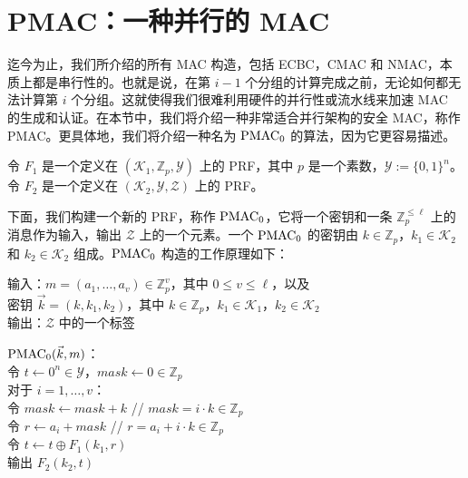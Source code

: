 \section{PMAC：一种并行的 MAC}\label{sec:6-11}

迄今为止，我们所介绍的所有 MAC 构造，包括 ECBC，CMAC 和 NMAC，本质上都是串行性的。也就是说，在第 $i-1$ 个分组的计算完成之前，无论如何都无法计算第 $i$ 个分组。这就使得我们很难利用硬件的并行性或流水线来加速 MAC 的生成和认证。在本节中，我们将介绍一种非常适合并行架构的安全 MAC，称作 PMAC。更具体地，我们将介绍一种名为 $\rm PMAC_0$ 的算法，因为它更容易描述。

令 $F_1$ 是一个定义在 $(\mathcal{K}_1,\mathbb{Z}_p,\mathcal{Y})$ 上的 PRF，其中 $p$ 是一个素数，$\mathcal{Y}:=\{0,1\}^n$。令 $F_2$ 是一个定义在 $(\mathcal{K}_2,\mathcal{Y},\mathcal{Z})$ 上的 PRF。

下面，我们构建一个新的 PRF，称作 $\rm PMAC_0$，它将一个密钥和一条 $\mathbb{Z}^{\leq\ell}_p$ 上的消息作为输入，输出 $\mathcal{Z}$ 上的一个元素。一个 $\rm PMAC_0$ 的密钥由 $k\in\mathbb{Z}_p$，$k_1\in\mathcal{K}_2$ 和 $k_2\in\mathcal{K}_2$ 组成。$\rm PMAC_0$ 构造的工作原理如下：

\vspace{5pt}

\hspace*{5pt} 输入：$m=(a_1,\dots,a_v)\in\mathbb{Z}^v_p$，其中 $0\leq v\leq\ell$，以及\\
\hspace*{75pt} 密钥 $\vec{k}=(k,k_1,k_2)$，其中 $k\in\mathbb{Z}_p$，$k_1\in\mathcal{K}_1$，$k_2\in\mathcal{K}_2$\\
\hspace*{26pt} 输出：$\mathcal{Z}$ 中的一个标签

\vspace{5pt}

\hspace*{5pt} ${\rm PMAC}_0(\vec{k},m)$：\\
\hspace*{50pt} 令 $t\leftarrow 0^n\in\mathcal{Y}$，$mask\leftarrow 0\in\mathbb{Z}_p$\\
\hspace*{50pt} 对于 $i=1,\dots,v$：\\
\hspace*{75pt} 令 $mask\leftarrow mask+k$ \quad\quad // $mask=i\cdot k\in\mathbb{Z}_p$\\
\hspace*{75pt} 令 $r\leftarrow a_i+mask$ \quad\quad\quad\; // $r=a_i+i\cdot k\in\mathbb{Z}_p$\\
\hspace*{75pt} 令 $t\leftarrow t\oplus F_1(k_1,r)$\\
\hspace*{50pt} 输出 $F_2(k_2,t)$


